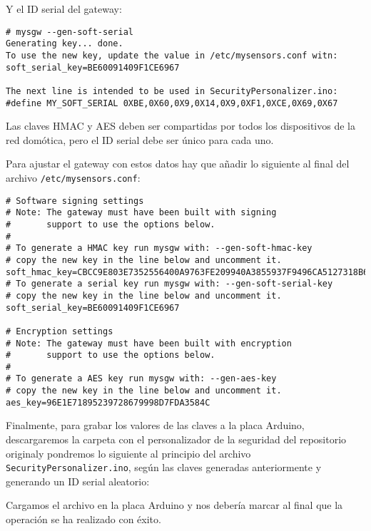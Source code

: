 Y el ID serial del gateway:

\begin{lstlisting}[breakatwhitespace=false]
# mysgw --gen-soft-serial 
Generating key... done.
To use the new key, update the value in /etc/mysensors.conf witn:
soft_serial_key=BE60091409F1CE6967

The next line is intended to be used in SecurityPersonalizer.ino:
#define MY_SOFT_SERIAL 0XBE,0X60,0X9,0X14,0X9,0XF1,0XCE,0X69,0X67
\end{lstlisting}

Las claves HMAC y AES deben ser compartidas por todos los dispositivos de la
red domótica, pero el ID serial debe ser único para cada uno.

Para ajustar el gateway con estos datos hay que añadir lo siguiente al final
del archivo \verb|/etc/mysensors.conf|:

\begin{lstlisting}
# Software signing settings
# Note: The gateway must have been built with signing
#       support to use the options below.
#
# To generate a HMAC key run mysgw with: --gen-soft-hmac-key
# copy the new key in the line below and uncomment it.
soft_hmac_key=CBCC9E803E7352556400A9763FE209940A3855937F9496CA5127318B64332771
# To generate a serial key run mysgw with: --gen-soft-serial-key
# copy the new key in the line below and uncomment it.
soft_serial_key=BE60091409F1CE6967

# Encryption settings
# Note: The gateway must have been built with encryption
#       support to use the options below.
#
# To generate a AES key run mysgw with: --gen-aes-key
# copy the new key in the line below and uncomment it.
aes_key=96E1E71895239728679998D7FDA3584C
\end{lstlisting}

Finalmente, para grabar los valores de las claves a la placa Arduino,
descargaremos la carpeta con el personalizador de la seguridad del repositorio
original\footnotemark y pondremos lo siguiente al principio del archivo
\verb|SecurityPersonalizer.ino|, según las claves generadas anteriormente y
generando un ID serial aleatorio:




Cargamos el archivo en la placa Arduino y nos debería marcar al final que la
operación se ha realizado con éxito.

